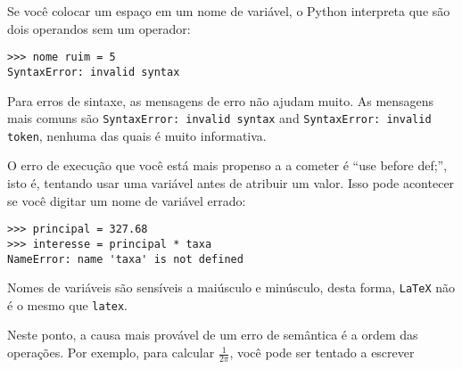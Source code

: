 
Se você colocar um espaço em um nome de variável, o Python interpreta que são dois 
operandos sem um operador: 

\beforeverb
\begin{verbatim}
>>> nome ruim = 5
SyntaxError: invalid syntax
\end{verbatim}
\afterverb
%

Para erros de sintaxe, as mensagens de erro não ajudam muito. 
As mensagens mais comuns são {\tt SyntaxError: invalid syntax} and
{\tt SyntaxError: invalid token}, nenhuma das quais é muito informativa.


O erro de execução que você está mais propenso a a cometer é ``use 
before def;'', isto é, tentando usar uma variável antes de atribuir 
um valor. Isso pode acontecer se você digitar um nome de variável errado:

\beforeverb
\begin{verbatim}
>>> principal = 327.68
>>> interesse = principal * taxa
NameError: name 'taxa' is not defined
\end{verbatim}
\afterverb
%
Nomes de variáveis são sensíveis a maiúsculo e minúsculo, desta forma, {\tt LaTeX} 
não é o mesmo que {\tt latex}.


Neste ponto, a causa mais provável de um erro de semântica é 
a ordem das operações. Por exemplo, para calcular $\frac{1}{2 \pi}$,
você pode ser tentado a escrever

